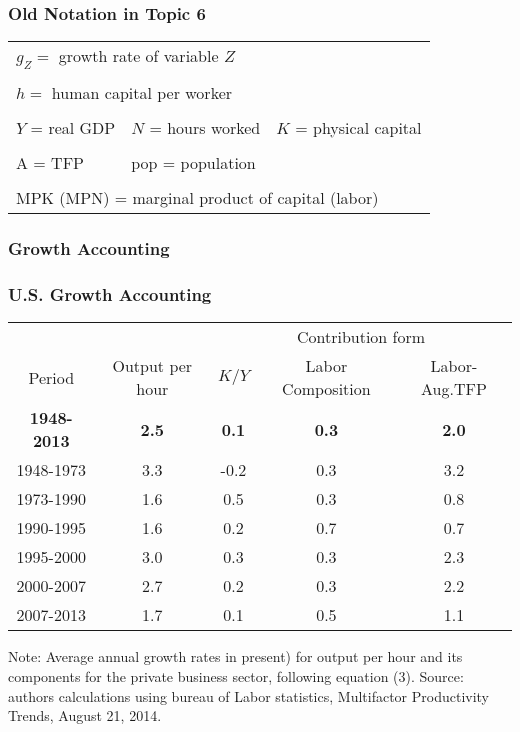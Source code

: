 \documentclass[serif,professionalfont,red,aspectratio=169]{beamer}
\begin{document}
\begin{frame}[t]
\frametitle{Old Notation in Topic 6}
\begin{table}
\centering
    \begin{tabular}{l l l}
       \multicolumn{3}{l}{$g_Z=$  growth rate of variable $Z$ }\\
       \\
       \multicolumn{3}{l}{$h=$ human capital per worker}\\
   \\
      $Y$ = real GDP  &   $N$ = hours worked  &   $K$ = physical capital  \\
 \\
 A = TFP  &   pop = population &\\
 \\
         \multicolumn{3}{l}{MPK (MPN) = marginal product of capital (labor)} \\
    \end{tabular}
\end{table}
\end{frame}
\begin{frame}[t]
\frametitle{Growth Accounting}
\end{frame}
\begin{frame}[t]
\frametitle{U.S. Growth Accounting}
\begin{table}
\centering
{\renewcommand{\arraystretch}{1.2}
    \begin{tabular}{c c c c c}
    \cline{3-5}
      && \multicolumn{3}{c}{Contribution form }\\
      Period & Output per hour &$K/Y$ & Labor Composition & Labor-Aug.TFP\\
     \hline
     \textbf{1948-2013} & \textbf{2.5} &\textbf{0.1} &\textbf{0.3} &\textbf{2.0}\\
     1948-1973&3.3 &-0.2 &0.3 &3.2\\
     1973-1990 & 1.6 &0.5 &0.3 &0.8\\
     1990-1995 &1.6 &0.2 &0.7 &0.7\\
     1995-2000 &3.0 &0.3 &0.3&2.3\\
     2000-2007&2.7 &0.2 &0.3 &2.2\\
     2007-2013&1.7 &0.1 &0.5 &1.1\\
    \end{tabular}}
\end{table}
\small{Note: Average annual growth rates in present) for output per hour and its components for the private business sector, following equation (3). Source: authors calculations using bureau of Labor statistics, Multifactor Productivity Trends, August 21, 2014.} 
\end{frame}
\end{document}
